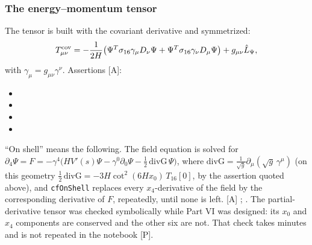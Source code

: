 \subsubsection{The energy--momentum tensor}
\label{sec:2.12.3}
The tensor is built with the covariant derivative and symmetrized:
\begin{equation}
  T^{\rm cov}_{\mu\nu}=-\frac{1}{2H}\bigl(\Psi^{T}\sigma_{16}\gamma_\mu D_\nu\Psi+\Psi^{T}\sigma_{16}\gamma_\nu D_\mu\Psi\bigr)
  +g_{\mu\nu}\hat L_\Psi,
\end{equation}
with $\gamma_\mu=g_{\mu\nu}\gamma^\nu$.
Assertions [A]:
\begin{itemize}
  \item {}
  \item {}
  \item {}
  \item {}
\end{itemize}
``On shell'' means the following. The field equation is solved for
$\partial_4\Psi=F=-\gamma^4\bigl(HV'(s)\Psi-\gamma^0\partial_0\Psi-\tfrac12\,\mathrm{divG}\,\Psi\bigr)$,
where $\mathrm{divG}=\frac{1}{\sqrt g}\partial_\mu(\sqrt g\,\gamma^\mu)$ (on this geometry
$\tfrac12\,\mathrm{divG}=-3H\cot^2(6Hx_0)\,T_{16}[0]$, by the assertion quoted above), and
\texttt{cfOnShell} replaces every $x_4$-derivative of the field by the corresponding
derivative of $F$, repeatedly, until none is left. [A]
;
. The
partial-derivative tensor was checked symbolically while Part VI was designed: its $x_0$ and
$x_4$ components are conserved and the other six are not. That check takes minutes and is not
repeated in the notebook [P].

